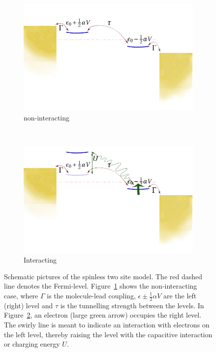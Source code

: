 \begin{figure}[htb]
    \begin{subfigure}[b]{0.48\textwidth}
        \includegraphics[height=.20\textheight]{pdf/non_interacting_schematics.pdf}\caption{non\hyp{}interacting}\label{fig:twositea}
    \end{subfigure}
    ~
    \begin{subfigure}[!tb]{0.48\textwidth}
        \includegraphics[height=.20\textheight]{pdf/interacting_schematics.pdf}\caption{Interacting}\label{fig:twositeb}
    \end{subfigure}
    \caption{Schematic pictures of the spinless two site model. The red dashed line denotes the Fermi-level. Figure~\ref{fig:twositea} shows the non\hyp{}interacting case, where $\Gamma$ is the molecule-lead coupling, $\epsilon \pm \frac{1}{2} \alpha V$ are the left (right) level and $\tau$ is the tunnelling strength between the levels. In Figure~\ref{fig:twositeb}, an electron (large green arrow) occupies the right level. The swirly line is meant to indicate an interaction with electrons on the left level, thereby raising the level with the capacitive interaction or charging energy $U$.} \label{fig:twosite}
\end{figure}

